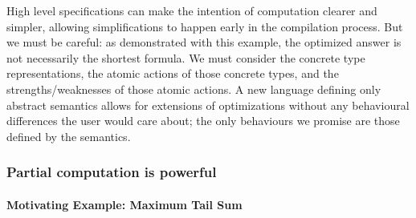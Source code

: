 High level specifications can make the intention of computation clearer and simpler, allowing simplifications to happen early in the compilation process. But we must be careful: as demonstrated with this example, the optimized answer is not necessarily the shortest formula. We must consider the concrete type representations, the atomic actions of those concrete types, and the strengths/weaknesses of those atomic actions. A new language defining only abstract semantics allows for extensions of optimizations without any behavioural differences the user would care about; the only behaviours we promise are those defined by the semantics.


\subsubsection{Partial computation is powerful}
\paragraph{Motivating Example: Maximum Tail Sum}




